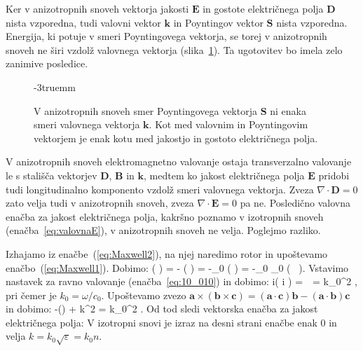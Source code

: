 Ker v anizotropnih snoveh vektorja jakosti $\mathbf{E}$ in gostote električnega 
polja $\mathbf{D}$ nista vzporedna, tudi valovni vektor $\mathbf{k}$ in Poyntingov vektor 
$\mathbf{S}$ nista vzporedna. Energija, ki potuje v smeri Poyntingovega vektorja, se
torej v anizotropnih snoveh ne širi vzdolž valovnega vektorja (slika~\ref{fig:10_koti}). 
Ta ugotovitev bo imela zelo zanimive posledice.
\begin{figure}[!h]
\centering
\def\svgwidth{40truemm} 

\caption{V anizotropnih snoveh smer Poyntingovega 
vektorja $\mathbf{S}$ ni enaka smeri valovnega vektorja $\mathbf{k}$. Kot med 
valovnim in Poyntingovim vektorjem je enak kotu med jakostjo in 
gostoto električnega polja.}
\label{fig:10_koti}
\vglue-3truemm
\end{figure}

V anizotropnih snoveh elektromagnetno valovanje ostaja transverzalno
valovanje le s stališča vektorjev $\mathbf{D}$, $\mathbf{B}$ in 
$\mathbf{k}$, medtem ko jakost električnega polja $\mathbf{E}$ pridobi 
tudi longitudinalno komponento vzdolž smeri valovnega vektorja. 
Zveza $\nabla \cdot \mathbf{D} = 0$ zato velja tudi v anizotropnih snoveh, zveza 
$\nabla \cdot \mathbf{E} = 0$ pa ne. Posledično valovna
enačba za jakost električnega polja, kakršno poznamo
v izotropnih snoveh (enačba~\ref{eq:valovnaE}), v anizotropnih snoveh ne velja. Poglejmo razliko.

Izhajamo iz enačbe~(\ref{eq:Maxwell2}), na njej naredimo rotor in upoštevamo
enačbo~(\ref{eq:Maxwell1}). Dobimo:
\beq
\nabla \times \left( \nabla \times {} \right) = -  
\left( \nabla \times {} \right) = -\mu_0  
\left( \nabla \times {} \right) = -\mu_0 \varepsilon_0 
 \left( \underline{\varepsilon}\, \right).
\label{eq:10_021}
\eeq
Vstavimo nastavek za ravno valovanje (enačba~\ref{eq:10_010}) in dobimo:
\beq
i\times \left( i  \times {}\right) = 
\,\underline{\varepsilon}\, = 
k_0^2\,\underline{\varepsilon}\,,
\label{eq:10_022}
\eeq
pri čemer je $k_0 = \omega / c_0$. Upoštevamo zvezo $\mathbf{a}\times
\left( \mathbf{b}\times \mathbf{c}\right) = \left(\mathbf{a}\cdot 
\mathbf{c}\right) \mathbf{b} - \left(\mathbf{a}\cdot \mathbf{b}\right) \mathbf{c}$
in dobimo:
\beq
-\left(\cdot {}\right) + k^2  = 
k_0^2\,\underline{\varepsilon}\,.
\label{eq:10_024}
\eeq
Od tod sledi vektorska enačba za jakost električnega polja:
V izotropni snovi je izraz na desni strani enačbe enak 0 
in velja $k = k_0\sqrt{\varepsilon} = k_0 n$. 

